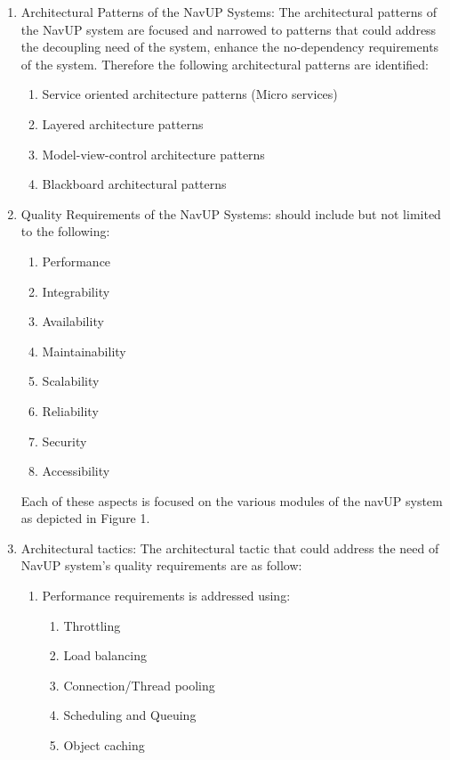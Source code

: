 \documentclass[12pt]{article}
\begin{document}
\begin{enumerate}
\item Architectural Patterns of the NavUP Systems: The architectural patterns of the NavUP system are focused and narrowed to patterns that could address the decoupling need of the system, enhance the no-dependency requirements of the system.   Therefore the   following architectural patterns are  identified: \begin{enumerate}
\item Service oriented architecture patterns  (Micro services)
\item Layered architecture patterns 
\item Model-view-control architecture patterns 
\item Blackboard architectural patterns 

\end{enumerate}
\item Quality Requirements of  the NavUP Systems: should include but not limited to the following:\begin{enumerate}
\item Performance 
\item Integrability
\item Availability
\item Maintainability
\item Scalability
\item Reliability 
\item Security
\item Accessibility

\end{enumerate}
Each of these aspects is focused on the various modules of the navUP system as depicted in Figure  1.

\item Architectural tactics: The architectural tactic that could address the need of NavUP system’s  quality requirements are as follow: \begin{enumerate}
\item Performance requirements is addressed using:\begin{enumerate}
\item Throttling  
\item Load balancing 
\item Connection/Thread pooling
\item Scheduling  and Queuing  
\item Object caching

\end{enumerate}

\end{enumerate}
\end{enumerate}
\end{document}
